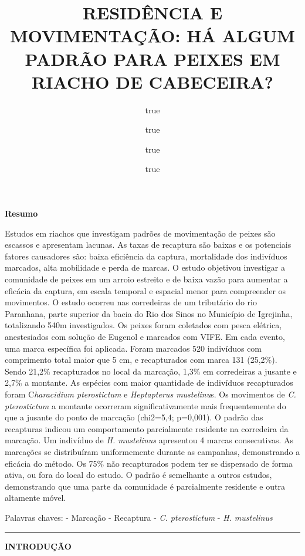 \documentclass[
]{article}
\title{RESIDÊNCIA E MOVIMENTAÇÃO: HÁ ALGUM PADRÃO PARA PEIXES EM RIACHO
DE CABECEIRA?}
\author{true \and true \and true \and true}
\date{}
\begin{document}
\maketitle

\textbf{Resumo}

Estudos em riachos que investigam padrões de movimentação de peixes são
escassos e apresentam lacunas. As taxas de recaptura são baixas e os
potenciais fatores causadores são: baixa eficiência da captura,
mortalidade dos indivíduos marcados, alta mobilidade e perda de marcas.
O estudo objetivou investigar a comunidade de peixes em um arroio
estreito e de baixa vazão para aumentar a eficácia da captura, em escala
temporal e espacial menor para compreender os movimentos. O estudo
ocorreu nas corredeiras de um tributário do rio Paranhana, parte
superior da bacia do Rio dos Sinos no Município de Igrejinha,
totalizando 540m investigados. Os peixes foram coletados com pesca
elétrica, anestesiados com solução de Eugenol e marcados com VIFE. Em
cada evento, uma marca específica foi aplicada. Foram marcados 520
indivíduos com comprimento total maior que 5 cm, e recapturados com
marca 131 (25,2\%). Sendo 21,2\% recapturados no local da marcação,
1,3\% em corredeiras a jusante e 2,7\% a montante. As espécies com maior
quantidade de indivíduos recapturados foram C\emph{haracidium
pterostictum} e \emph{Heptapterus mustelinu}s. Os movimentos de \emph{C.
pterostictum} a montante ocorreram significativamente mais
frequentemente do que a jusante do ponto de marcação (chi2=5,4;
p=0,001). O padrão das recapturas indicou um comportamento parcialmente
residente na corredeira da marcação. Um indivíduo de \emph{H.
mustelinus} apresentou 4 marcas consecutivas. As marcações se
distribuíram uniformemente durante as campanhas, demonstrando a eficácia
do método. Os 75\% não recapturados podem ter se dispersado de forma
ativa, ou fora do local do estudo. O padrão é semelhante a outros
estudos, demonstrando que uma parte da comunidade é parcialmente
residente e outra altamente móvel.

Palavras chaves: - Marcação - Recaptura - \emph{C. pterostictum} -
\emph{H. mustelinus}

\begin{center}\rule{0.5\linewidth}{0.5pt}\end{center}

\textbf{INTRODUÇÃO}
\end{document}

